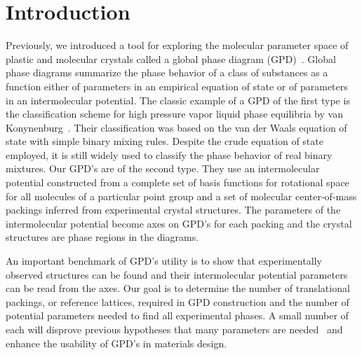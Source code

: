\documentclass[preprint]{revtex4}              %
\begin{document}

\dedication{Hier k{\"o}nnte ein Widmungstext stehen.}



\section{Introduction}

Previously, we introduced a tool for exploring the molecular
parameter space of plastic and molecular crystals called a global
phase diagram (GPD)~\cite{Keith04c,Mettes04}. Global phase diagrams
summarize the phase behavior of a class of substances as a function
either of parameters in an empirical equation of state or of
parameters in an intermolecular potential. The classic example of a
GPD of the first type is the classification scheme for high pressure
vapor liquid phase equilibria by van
Konynenburg~\cite{VanKonynenburg80}. Their classification was based
on the van der Waals equation of state with simple binary mixing
rules. Despite the crude equation of state employed, it is still
widely used to classify the phase behavior of real binary mixtures.
Our GPD's are of the second type. They use an intermolecular
potential constructed from a complete set of basis functions for
rotational space for all molecules of a particular point group and a
set of molecular center-of-mass packings inferred from experimental
crystal structures. The parameters of the intermolecular potential
become axes on GPD's for each packing and the crystal structures are
phase regions in the diagrams.

An important benchmark of GPD's utility is to show that
experimentally observed structures can be found and their
intermolecular potential parameters can be read from the axes. Our
goal is to determine the number of translational packings, or
reference lattices, required in GPD construction and the number of
potential parameters needed to find all experimental phases.  A
small number of each will disprove previous hypotheses that many
parameters are needed~\cite{Briels80} and enhance the usability of
GPD's in materials design.
\end{document}
